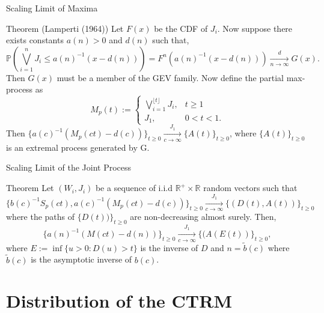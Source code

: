 \documentclass{beamer}
\newcommand{\Prob}{\mathbb{P}}
\begin{document}
\begin{frame}{Scaling Limit of Maxima}
	\begin{block}{Theorem (Lamperti (1964))}
		Let $F(x)$ be the CDF of $J_i$. Now suppose there exists constants $a(n)>0$ and $d(n)$ such that,
		\[
		    \Prob\left(\bigvee_{i=1}^n J_i\leq a(n)^{-1}(x-d(n))\right)=F^n(a(n)^{-1}(x-d(n))) \xrightarrow[n\to \infty]{d} G(x).
		\]
		Then $G(x)$ must be a member of the GEV family. Now define the partial max-process as
		\[
	        M_p(t):=
	        \begin{cases}
	            \bigvee_{i=1}^{\lfloor{t}\rfloor} J_i, &\textrm{$t\geq 1$}\\
	            J_1, &\textrm{$0<t<1.$}
	        \end{cases}
		\]
		Then $\{a(c)^{-1}(M_p(ct)-d(c))\}_{t\geq0} \xrightarrow[c\to \infty]{J_1} \{A(t)\}_{t\geq0}$, where $\{A(t)\}_{t\geq0}$ is an extremal process generated by G.
	\end{block}
\end{frame}

\begin{frame}{Scaling Limit of the Joint Process}
    \begin{block}{Theorem}
        Let $(W_i,J_i)$ be a sequence of i.i.d $\mathbb{R}^+\times\mathbb{R}$ random vectors such that
        \[
            \{b(c)^{-1}S_p(ct),a(c)^{-1}(M_p(ct)-d(c))\}_{t\geq0} \xrightarrow[c\to \infty]{J_1} \{(D(t),A(t))\}_{t\geq0}
        \]
        where the paths of $\{D(t))\}_{t\geq0}$ are non-decreasing almost surely. Then,
        \[
            \{a(n)^{-1}(M(ct)-d(n))\}_{t\geq0} \xrightarrow[c\to \infty]{J_1} \{(A(E(t))\}_{t\geq0},
        \]
        where $E:=\inf \{u>0:D(u)>t\}$ is the inverse of $D$ and $n= \tilde{b}(c)$ where $\tilde{b}(c)$ is the asymptotic inverse of $b(c)$.
    \end{block}
\end{frame}

\section{Distribution of the CTRM}
\end{document}
